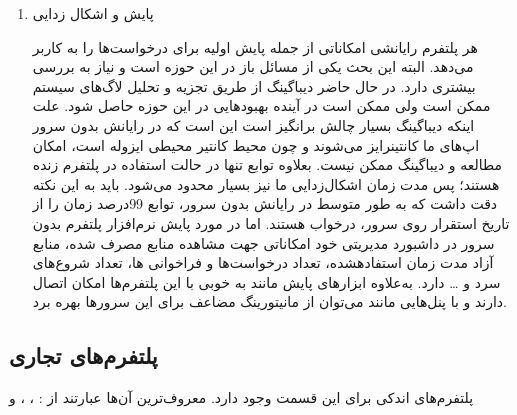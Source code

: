 \begin{enumerate}
	 \item پایش و اشکال زدایی
	 
	 هر پلتفرم رایانشی امکاناتی از جمله پایش اولیه برای درخواست‌ها را به کاربر می‌دهد. البته این بحث یکی از مسائل باز در این حوزه است و نیاز به بررسی بیشتری دارد. در حال حاضر دیباگینگ از طریق تجزیه و تحلیل لاگ‌های سیستم ممکن است ولی ممکن است در آینده بهبود‌هایی در این حوزه حاصل شود. علت اینکه دیباگینگ بسیار چالش برانگیز است این است که در رایانش بدون سرور اپ‌های ما کانتینرایز می‌شوند و چون محیط کانتیر محیطی ایزوله است، امکان مطالعه و دیباگینگ ممکن نیست. بعلاوه توابع تنها در حالت استفاده در پلتفرم زنده هستند؛ پس مدت زمان اشکال‌زدایی ما نیز بسیار محدود می‌شود. باید به این نکته دقت داشت که به طور متوسط در رایانش بدون سرور، توابع 99درصد زمان را از تاریخ استقرار روی سرور، درخواب هستند.
	 اما در مورد پایش نرم‌افزار پلتفرم بدون سرور در داشبورد مدیریتی خود امکاناتی جهت مشاهده منابع مصرف شده، منابع آزاد مدت زمان استفادهشده، تعداد درخواست‌ها و فراخوانی ها، تعداد شروع‌های سرد و … دارد. به‌علاوه ابزارهای پایش مانند       به خوبی با این پلتفرم‌ها امکان اتصال دارند و با پنل‌هایی مانند  می‌توان از مانیتورینگ مضاعف برای این سرور‌ها بهره برد.
\end{enumerate}

\subsection{پلتفرم‌های تجاری}

پلتفرم‌های اندکی برای این قسمت وجود دارد. معروف‌ترین آ‌ن‌ها عبارتند از :  ، ،  و 


